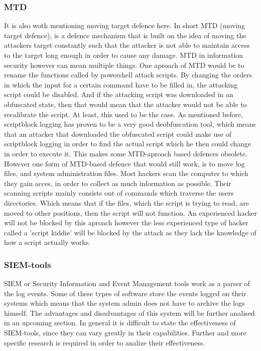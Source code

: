 \documentclass{article}%
\begin{document}
\subsubsection{MTD}
It is also woth mentioning moving target defence here. In short MTD (moving target defence), is a defence mechanism that is built on the idea of moving the attackers target constantly such that the attacker is not able to maintain access to the target long enough in order to cause any damage. MTD in information security however can mean multiple things. One aproach of MTD would be to rename the functions called by powershell attack scripts. By changing the orders in which the input for a certain command have to be filled in, the attacking script could be disabled. And if the attacking script was downloaded in an obfuscated state, then that would mean that the attacker would not be able to recalibrate the script. At least, this used to be the case. As mentioned before, scriptblock logging has proven to be a very good deobfuscation tool, which means that an attacker that downloaded the obfuscated script could make use of scriptblock logging in order to find the actual script which he then could change in order to execute it. This makes some MTD-aproach based defences obsolete. However one form of MTD-based defence that would still work, is to move log files, and system administration files. Most hackers scan the computer to which they gain acces, in order to collect as much information as possible. Their scanning scripts mainly consists out of commands which traverse the users directories. Which means that if the files, which the script is trying to read, are moved to other positions, then the script will not function. An experienced hacker will not be blocked by this aproach however the less experienced type of hacker called a 'script kiddie' will be blocked by the attack as they lack the knowledge of how a script actually works.
\subsubsection{SIEM-tools}
SIEM or Security Information and Event Management tools work as a parser of the log events. Some of these types of software store the events logged on their systems which means that the system admin does not have to archive the logs himself. The advantages and disadvantages of this system will be further analised in an upcoming section. In general it is difficult to state the effectiveness of SIEM-tools, since they can vary greatly in their capabilities. Further and more specific research is required in order to analize their effectiveness.
\end{document}
